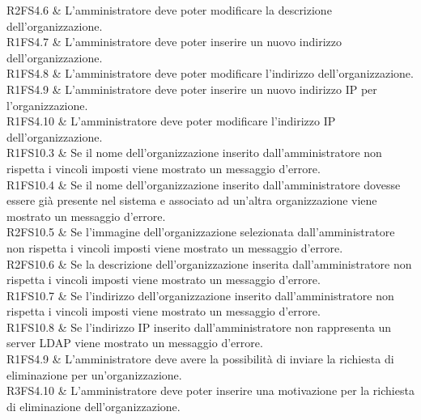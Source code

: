 R2FS4.6 & L'amministratore deve poter modificare la descrizione dell'organizzazione. \\

R1FS4.7 & L'amministratore deve poter inserire un nuovo indirizzo dell'organizzazione.\\

R1FS4.8 & L'amministratore deve poter modificare l'indirizzo dell'organizzazione. \\

R1FS4.9 & L'amministratore deve poter inserire un nuovo indirizzo IP per l'organizzazione. \\

R1FS4.10 & L'amministratore deve poter modificare l'indirizzo IP dell'organizzazione. \\

R1FS10.3 & Se il nome dell'organizzazione inserito dall'amministratore non rispetta i vincoli imposti viene mostrato un messaggio d'errore. \\

R1FS10.4 & Se il nome dell'organizzazione inserito dall'amministratore dovesse essere già presente nel sistema e associato ad un'altra organizzazione viene mostrato un messaggio d'errore. \\

R2FS10.5 & Se l'immagine dell'organizzazione selezionata dall'amministratore non rispetta i vincoli imposti viene mostrato un messaggio d'errore.\\

R2FS10.6 & Se la descrizione dell'organizzazione inserita dall'amministratore non rispetta i vincoli imposti viene mostrato un messaggio d'errore.\\

R1FS10.7 & Se l'indirizzo dell'organizzazione inserito dall'amministratore non rispetta i vincoli imposti viene mostrato un messaggio d'errore. \\

R1FS10.8 & Se l'indirizzo IP inserito dall'amministratore non rappresenta un server LDAP viene mostrato un messaggio d'errore. \\

R1FS4.9 & L'amministratore deve avere la possibilità di inviare la richiesta di eliminazione per un'organizzazione. \\

R3FS4.10 & L'amministratore deve poter inserire una motivazione per la richiesta di eliminazione dell'organizzazione. \\

